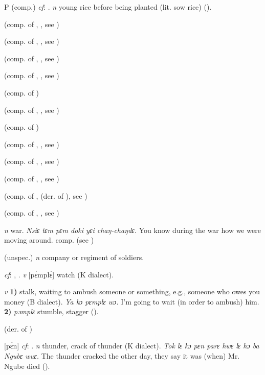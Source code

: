 \begin{letter}{P}
 (comp.) \textit{cf}: . \textit{n} young rice before being planted (lit. sow rice) (\citealt{Pichl1967}). 

 (comp. of , , see ) 

 (comp. of , , see ) 

 (comp. of , , see ) 

 (comp. of , , see ) 

 (comp. of ) 

 (comp. of , , see ) 

 (comp. of ) 

 (comp. of , , see ) 

 (comp. of , , see ) 

 (comp. of , , see ) 

 (comp. of ,  (der. of ), see ) 

 (comp. of , , see ) 

 \textit{n} war. \textit{Nsiɛ tɛm pɛm doki yɛi chaŋ-chaŋdɛ.} You know during the war how we were moving around. comp.  (see ) 

 (unspec.) \textit{n} company or regiment of soldiers.

 \textit{cf}: , . \textit{v} [pɛ́mplɛ́] watch (K dialect). 

 \textit{v} \textbf{1)} stalk, waiting to ambush someone or something, e.g., someone who owes you money (B dialect). \textit{Ya kɔ pɛmplɛ wɔ.} I'm going to wait (in order to ambush) him. \textbf{2)} \textit{pəmplɛ} stumble, stagger (\citealt{Pichl1967}). 

 (der. of )

 [pɛ́n] \textit{cf}: . \textit{n} thunder, crack of thunder (K dialect). \textit{Tok lɛ kɔ pɛn parɛ hwɛ lɛ hɔ ba Ngubɛ wuɛ.} The thunder cracked the other day, they say it was (when) Mr. Ngube died (\citealt{Pichl1967}). 


\end{letter}
